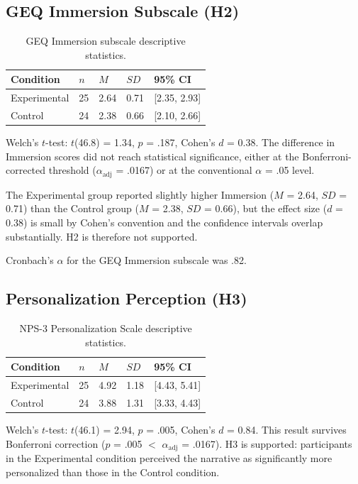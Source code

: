 \subsection{GEQ Immersion Subscale (H2)}

\begin{table}[H]
\centering
\caption{GEQ Immersion subscale descriptive statistics.}
\label{tab:geq_immersion}
\small
\begin{tabular}{@{}lllll@{}}
\toprule
\textbf{Condition} & $n$ & $M$ & $SD$ & \textbf{95\% CI} \\
\midrule
Experimental & 25 & 2.64 & 0.71 & [2.35, 2.93] \\
Control & 24 & 2.38 & 0.66 & [2.10, 2.66] \\
\bottomrule
\end{tabular}
\end{table}

Welch's $t$-test: $t$(46.8) = 1.34, $p$ = .187, Cohen's $d$ = 0.38. The difference in Immersion scores did not reach statistical significance, either at the Bonferroni-corrected threshold ($\alpha_{\text{adj}}$ = .0167) or at the conventional $\alpha$ = .05 level.

The Experimental group reported slightly higher Immersion ($M$ = 2.64, $SD$ = 0.71) than the Control group ($M$ = 2.38, $SD$ = 0.66), but the effect size ($d$ = 0.38) is small by Cohen's convention and the confidence intervals overlap substantially. H2 is therefore not supported.

Cronbach's $\alpha$ for the GEQ Immersion subscale was .82.

\subsection{Personalization Perception (H3)}

\begin{table}[H]
\centering
\caption{NPS-3 Personalization Scale descriptive statistics.}
\label{tab:nps3}
\small
\begin{tabular}{@{}lllll@{}}
\toprule
\textbf{Condition} & $n$ & $M$ & $SD$ & \textbf{95\% CI} \\
\midrule
Experimental & 25 & 4.92 & 1.18 & [4.43, 5.41] \\
Control & 24 & 3.88 & 1.31 & [3.33, 4.43] \\
\bottomrule
\end{tabular}
\end{table}

Welch's $t$-test: $t$(46.1) = 2.94, $p$ = .005, Cohen's $d$ = 0.84. This result survives Bonferroni correction ($p$ = .005 $<$ $\alpha_{\text{adj}}$ = .0167). H3 is supported: participants in the Experimental condition perceived the narrative as significantly more personalized than those in the Control condition.


